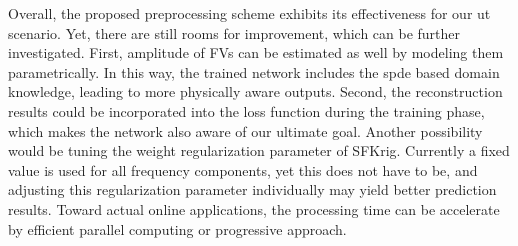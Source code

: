 Overall, the proposed preprocessing scheme exhibits its effectiveness for our \acrshort*{ut} scenario. Yet, there are still rooms for improvement, which can be further investigated. First, amplitude of \glspl*{FV} can be estimated as well by modeling them parametrically. In this way, the trained network includes the \acrshort*{spde} based domain knowledge, leading to more physically aware outputs. Second, the reconstruction results could be incorporated into the loss function during the training phase, which makes the network also aware of our ultimate goal. Another possibility would be tuning the weight regularization parameter of \acrshort*{SFKrig}. Currently a fixed value is used for all frequency components, yet this does not have to be, and adjusting this regularization parameter individually may yield better prediction results. Toward actual online applications, the processing time can be accelerate by efficient parallel computing or progressive approach. \par

